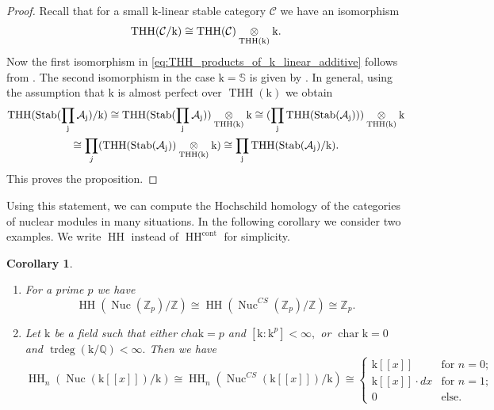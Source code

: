 \documentclass[11pt,leqno]{amsart}
\newtheorem{cor}[theo]{Corollary}
\numberwithin{equation}{section}
\def\bS{\mathbb{S}}
\def\Z{\mathbb{Z}}
\def\Q{\mathbb{Q}}
\newcommand{\tens}[1]{%
  \mathbin{\mathop{\otimes}\displaylimits_{#1}}%
}
\newcommand{\prodd}[1][]{\mathop{\prod}\limits_{#1}}
\newcommand{\Nuc}{\operatorname{Nuc}}
\newcommand{\cont}{\operatorname{cont}}
\newcommand{\mk}{\mathrm k}
\newcommand{\cA}{{\mathcal A}}
\newcommand{\cC}{{\mathcal C}}
\newcommand{\THH}{\operatorname{THH}}
\newcommand{\HH}{\operatorname{HH}}
\newcommand{\cha}{\operatorname{char}}
\newcommand{\Stab}{\rm Stab}
\newcommand{\trdeg}{\operatorname{trdeg}}
\begin{document}
\begin{proof}
Recall that for a small $\mk$-linear stable category $\cC$ we have an isomorphism
\begin{equation*}
\THH(\cC/\mk)\cong \THH(\cC)\tens{\THH(\mk)}\mk.
\end{equation*}
Now the first isomorphism in \eqref{eq:THH_products_of_k_linear_additive} follows from \cite[Proposition 2.10]{Cor}. The second isomorphism in the case $\mk=\bS$ is given by \cite[Proposition 2.15]{Cor}. In general, using the assumption that $\mk$ is almost perfect over $\THH(\mk)$ we obtain
\begin{multline*}
\THH(\Stab(\prodd[j]\cA_j)/\mk)\cong \THH(\Stab(\prodd[j]\cA_j))\tens{\THH(\mk)}\mk\cong (\prodd[j]\THH(\Stab(\cA_j)))\tens{\THH(\mk)}\mk\\
\cong \prodd[j](\THH(\Stab(\cA_j))\tens{\THH(\mk)}\mk)\cong \prodd[j]\THH(\Stab(\cA_j)/\mk).
\end{multline*}
This proves the proposition.
\end{proof}

Using this statement, we can compute the Hochschild homology of the categories of nuclear modules in many situations. In the following corollary we consider two examples. We write $\HH$ instead of $\HH^{\cont}$ for simplicity.

\begin{cor}\label{cor:HH_Nuc_examples}
\begin{enumerate}[label=(\roman*),ref=(\roman*)]
	\item For a prime $p$ we have
	\begin{equation}\label{eq:HH_Nuc_Z_p}
	\HH(\Nuc(\Z_p)/\Z)\cong \HH(\Nuc^{CS}(\Z_p)/\Z)\cong\Z_p.
	\end{equation} \label{HH_Nuc_Z_p}
	\item Let $\mk$ be a field such that either $cha \mk=p$ and $[\mk:\mk^p]<\infty,$ or $\cha \mk=0$ and $\trdeg(\mk/\Q)<\infty.$ Then we have
	\begin{equation}\label{eq:HH_Nuc_k[[x]]}
	\HH_n(\Nuc(\mk[[x]])/\mk)\cong \HH_n(\Nuc^{CS}(\mk[[x]])/\mk)\cong\begin{cases}
	\mk[[x]] & \text{for }n=0;\\
	\mk[[x]]\cdot dx & \text{for }n=1;\\
	0 & \text{else.}	
	\end{cases}
	\end{equation} \label{HH_Nuc_k[[x]]}
\end{enumerate}
\end{cor}
\end{document}
